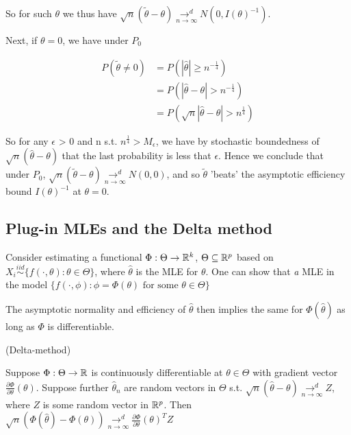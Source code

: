 \documentclass[a4paper]{article}
\begin{document}
\begin{remark}
\begin{enumerate}
		 So for such $\theta$ we thus have $\sqrt{n} (\tilde{\theta} - \theta) \underset{n\to \infty}{\to ^{d}} N(0, I(\theta)^{-1})$.

		 Next, if $\theta = 0$, we have under  $P_0$

		 \begin{align*}
		 	P\left( \tilde{\theta} \neq 0 \right) &= P\left( |\hat{\theta}| \ge n^{- \frac{1}{4}} \right) \\
			&= P\left( |\hat{\theta} - \theta| > n^{- \frac{1}{4}} \right) \\
			&= P\left( \sqrt{n}|\hat{\theta} - \theta| > n^{\frac{1}{4}}  \right)
		 \end{align*}

		 So for any $\epsilon$ > 0 and n s.t. $n^{\frac{1}{4}} > M_{\epsilon}$, we have by stochastic boundedness of $\sqrt{n}(\hat{\theta} - \theta) $ that the last probability is less that $\epsilon$. Hence we conclude that under  $P_0$, $\sqrt{n}(\tilde{\theta} - \theta) \underset{n\to \infty}{\to ^{d}} N(0,0)$, and so $\tilde{\theta}$ 'beats' the asymptotic efficiency bound $I(\theta)^{-1}$ at $\theta = 0$.
	\end{enumerate}
\end{remark}

\subsection{Plug-in MLEs and the Delta method}

Consider estimating a functional $\Phi : \Theta \to \mathbb{R}^{k}$, $\Theta \subseteq \mathbb{R}^{p}$ based on $X_i \stackrel{iid}{\sim} \{f\left( \cdot , \theta \right) : \theta \in \Theta \}$, where $\hat{\theta}$ is the MLE for $\theta$. One can show that \textit{a} MLE in the model  $\{f\left( \cdot , \phi \right) : \phi = \Phi(\theta) \text{ for some } \theta \in \Theta \}$

The asymptotic normality and efficiency of  $\hat{\theta}$ then implies the same for $\Phi(\hat{\theta})$ as long as $\Phi$ is differentiable.

\begin{thm}(Delta-method)
	
	Suppose $\Phi : \Theta \to \mathbb{R}$ is continuously differentiable at $\theta \in \Theta$ with gradient vector $\frac{\partial\Phi}{\partial\theta}(\theta)$. Suppose further $\hat{\theta}_n$ are random vectors in $\Theta$ s.t. $\sqrt{n}(\hat{\theta} - \theta) \underset{n\to \infty}{\to ^{d}} Z $, where $Z$ is some random vector in  $\mathbb{R}^{p}$. Then $\sqrt{n}(\Phi(\hat{\theta}) - \Phi(\theta)) \underset{n\to \infty}{\to ^{d}} \frac{\partial\Phi}{\partial\theta}(\theta)^{T} Z$
\end{thm}
\end{document}
